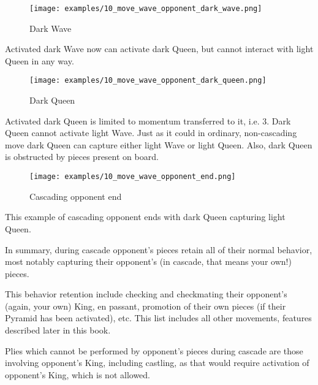 \clearpage %

\noindent
\begin{wrapfigure}[5]{l}{0.5625\textwidth}
\centering
\texttt{[image: examples/10\_move\_wave\_opponent\_dark\_wave.png]}
\caption{Dark Wave}
\label{fig:10_move_wave_opponent_dark_wave}
\end{wrapfigure}
Activated dark Wave now can activate dark Queen, but cannot interact with light Queen
in any way.

\vspace*{0.315\textheight}
\noindent
\begin{wrapfigure}[13]{r}{0.5625\textwidth}
\centering
\texttt{[image: examples/10\_move\_wave\_opponent\_dark\_queen.png]}
\caption{Dark Queen}
\label{fig:10_move_wave_opponent_dark_queen}
\end{wrapfigure}
Activated dark Queen is limited to momentum transferred to it, i.e. 3. Dark Queen
cannot activate light Wave. Just as it could in ordinary, non-cascading move dark
Queen can capture either light Wave or light Queen. Also, dark Queen is obstructed
by pieces present on board.

\clearpage %

\noindent
\begin{wrapfigure}[4]{l}{0.5625\textwidth}
\centering
\texttt{[image: examples/10\_move\_wave\_opponent\_end.png]}
\caption{Cascading opponent end}
\label{fig:10_move_wave_opponent_end}
\end{wrapfigure}
This example of cascading opponent ends with dark Queen capturing light Queen.

\vspace*{0.355\textheight}
In summary, during cascade opponent's pieces retain all of their normal behavior,
most notably capturing their opponent's (in cascade, that means your own!) pieces.

This behavior retention include checking and checkmating their opponent's (again,
your own) King, en passant, promotion of their own pieces (if their Pyramid has
been activated), etc. This list includes all other movements, features described
later in this book.

Plies which cannot be performed by opponent's pieces during cascade are those
involving opponent's King, including castling, as that would require activation
of opponent's King, which is not allowed.

